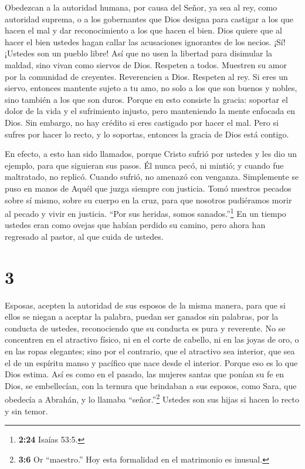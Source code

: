  Obedezcan a la autoridad humana, por causa del Señor, ya
sea al rey, como autoridad suprema,  o a los gobernantes
que Dios designa para castigar a los que hacen el mal y dar
reconocimiento a los que hacen el bien.  Dios quiere que al
hacer el bien ustedes hagan callar las acusaciones ignorantes de los
necios.  ¡Sí! ¡Ustedes son un pueblo libre! Así que no usen
la libertad para disimular la maldad, sino vivan como siervos de Dios.
 Respeten a todos. Muestren su amor por la comunidad de
creyentes. Reverencien a Dios. Respeten al rey.  Si eres un
siervo, entonces mantente sujeto a tu amo, no solo a los que son buenos
y nobles, sino también a los que son duros.  Porque en esto
consiste la gracia: soportar el dolor de la vida y el sufrimiento
injusto, pero manteniendo la mente enfocada en Dios.  Sin
embargo, no hay crédito si eres castigado por hacer el mal. Pero si
sufres por hacer lo recto, y lo soportas, entonces la gracia de Dios
está contigo.

 En efecto, a esto han sido llamados, porque Cristo sufrió
por ustedes y les dio un ejemplo, para que siguieran sus pasos.
 Él nunca pecó, ni mintió;  y cuando fue
maltratado, no replicó. Cuando sufrió, no amenazó con venganza.
Simplemente se puso en manos de Aquél que juzga siempre con justicia.
 Tomó nuestros pecados sobre sí mismo, sobre su cuerpo en
la cruz, para que nosotros pudiéramos morir al pecado y vivir en
justicia. ``Por sus heridas, somos sanados.''\footnote{\textbf{2:24}
  Isaías 53:5.}  En un tiempo ustedes eran como ovejas que
habían perdido su camino, pero ahora han regresado al pastor, al que
cuida de ustedes.

\hypertarget{section-2}{%
\section{3}\label{section-2}}

 Esposas, acepten la autoridad de sus esposos de la misma
manera, para que si ellos se niegan a aceptar la palabra, puedan ser
ganados sin palabras, por la conducta de ustedes, 
reconociendo que su conducta es pura y reverente.  No se
concentren en el atractivo físico, ni en el corte de cabello, ni en las
joyas de oro, o en las ropas elegantes;  sino por el
contrario, que el atractivo sea interior, que sea el de un espíritu
manso y pacífico que nace desde el interior. Porque eso es lo que Dios
estima.  Así es como en el pasado, las mujeres santas que
ponían su fe en Dios, se embellecían, con la ternura que brindaban a sus
esposos,  como Sara, que obedecía a Abrahán, y lo llamaba
``señor.''\footnote{\textbf{3:6} Or ``maestro.'' Hoy esta formalidad en
  el matrimonio es inusual.} Ustedes son sus hijas si hacen lo recto y
sin temor.

